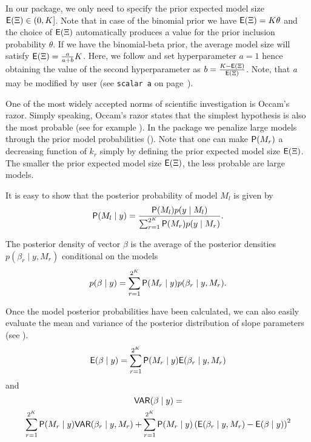 In our package, we only need to specify the prior expected model size
$\mathsf{E}(\Xi) \in \left (0, K \right ]$.  Note that in case of the binomial
prior we have $\mathsf{E}(\Xi)=K\theta$ and the choice of $\mathsf{E}(\Xi)$
automatically produces a value for the prior inclusion probability
$\theta$. If we have the binomial-beta prior, the average model size
will satisfy $\mathsf{E}(\Xi)=\frac {a}{a+b}K$. Here, we follow
\cite{Ley_Steel_jae_2009} and set hyperparameter $a=1$ hence obtaining
the value of the second hyperparameter as $b=\frac{K-\mathsf{E}(\Xi)}{\mathsf{E}(\Xi)}$.
Note, that \textit{a} may be modified by user (see \lstinline!scalar a!
on page~\pageref{opts:a}).

One of the most widely accepted norms of scientific investigation is
Occam's razor.  Simply speaking, Occam's razor states that the
simplest hypothesis is also the most probable (see for example
\citealt{MadiganDavidRafteryAdrian}). In the  package we penalize
large models through the prior model probabilities
(\citealt{Osiewalski_Steel_1994}). Note that one can make $\mathsf{P}(M_r)$
a decreasing function of $k_r$ simply by defining the prior expected
model size $\mathsf{E}(\Xi)$. The smaller the prior expected model size
$\mathsf{E}(\Xi)$, the less probable are large models.

It is easy to show that the posterior probability of model $M_l$ is given by
\begin{equation*}
	\mathsf{P}(M_l \mid y)= \frac{\mathsf{P}(M_l)p(y \mid M_l)}{\sum_{r=1}^{2^K} \mathsf{P}(M_r)p(y \mid M_r)}.
\end{equation*}

The posterior density of vector $\beta$ is the average
of the posterior densities $p(\beta_r \mid y, M_r)$ conditional on the models
\begin{equation*}
	p(\beta \mid y)=\sum_{r=1}^{2^K} \mathsf{P}(M_r \mid y)p(\beta_r \mid y, M_r).
\end{equation*}

Once the model posterior probabilities have been calculated, we can also easily
evaluate the mean and variance of the posterior distribution of slope parameters
(see \citealt{Leamer1978}).
\begin{equation}
	\mathsf{E}(\beta \mid y)=\sum_{r=1}^{2^K} \mathsf{P}(M_r \mid y)\mathsf{E}(\beta_r \mid y, M_r)
	\label{eq:mean_averaging}
\end{equation} 
and
\begin{multline}
	\mathsf{VAR}(\beta \mid y) = \\\sum_{r=1}^{2^K}\mathsf{P}(M_r \mid y)\mathsf{VAR}(\beta_r \mid y, M_r)+
	\sum_{r=1}^{2^K} \mathsf{P}(M_r \mid y) \left (\mathsf{E}(\beta_r \mid y, M_r)-\mathsf{E}(\beta \mid y) \right)^2
	\label{eq:variance_averaging}
\end{multline}

